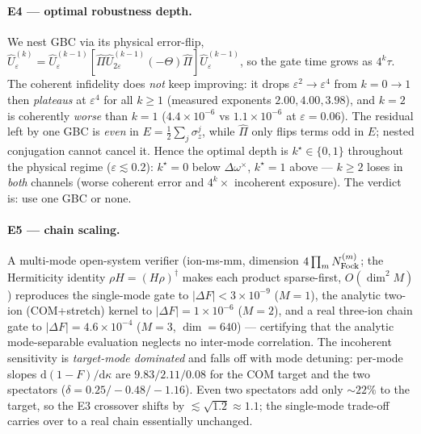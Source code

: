 \documentclass[aps,prapplied,twocolumn,superscriptaddress,floatfix,nofootinbib]{revtex4-2}
\begin{document}
\paragraph{E4 --- optimal robustness depth.} We nest GBC via its physical
error-flip, $\hat U^{(k)}_\varepsilon=\hat U^{(k-1)}_\varepsilon[\hat\Pi\hat
U^{(k-1)}_{2\varepsilon}(-\Theta)\hat\Pi]\hat U^{(k-1)}_\varepsilon$, so the gate time grows
as $4^k\tau$. The coherent infidelity does \emph{not} keep improving: it drops
$\varepsilon^2\!\to\!\varepsilon^4$ from $k{=}0\!\to\!1$ then \emph{plateaus} at $\varepsilon^4$
for all $k\ge1$ (measured exponents $2.00,4.00,3.98$), and $k{=}2$ is coherently \emph{worse}
than $k{=}1$ ($4.4\times10^{-6}$ vs $1.1\times10^{-6}$ at $\varepsilon=0.06$). The residual
left by one GBC is \emph{even} in $E=\tfrac12\sum_j\sigma_z^j$, while $\hat\Pi$ only flips
terms odd in $E$; nested conjugation cannot cancel it. Hence the optimal depth is
$k^\star\!\in\!\{0,1\}$ throughout the physical regime ($\varepsilon\lesssim0.2$): $k^\star=0$
below $\Delta\omega^\times$, $k^\star=1$ above --- $k\ge2$ loses in \emph{both} channels
(worse coherent error and $4^k\times$ incoherent exposure). The verdict is: use one GBC or none.

\paragraph{E5 --- chain scaling.} A multi-mode open-system verifier
(\textsf{ion-ms-mm}, dimension $4\prod_m N_{\rm Fock}^{(m)}$; the Hermiticity identity
$\rho H=(H\rho)^\dagger$ makes each product sparse-first, $O(\dim^2 M)$) reproduces the
single-mode gate to $|\Delta F|<3\times10^{-9}$ ($M{=}1$), the analytic two-ion (COM+stretch)
kernel to $|\Delta F|=1\times10^{-6}$ ($M{=}2$), and a real three-ion chain gate to
$|\Delta F|=4.6\times10^{-4}$ ($M{=}3$, $\dim=640$) --- certifying that the analytic
mode-separable evaluation neglects no inter-mode correlation. The incoherent sensitivity is
\emph{target-mode dominated} and falls off with mode detuning: per-mode slopes
$\mathrm d(1{-}F)/\mathrm d\kappa$ are $9.83/2.11/0.08$ for the COM target and the two
spectators ($\delta=0.25/{-}0.48/{-}1.16$). Even two spectators add only $\sim\!22\%$ to the
target, so the E3 crossover shifts by $\lesssim\!\sqrt{1.2}\approx1.1$; the single-mode
trade-off carries over to a real chain essentially unchanged.
\end{document}

